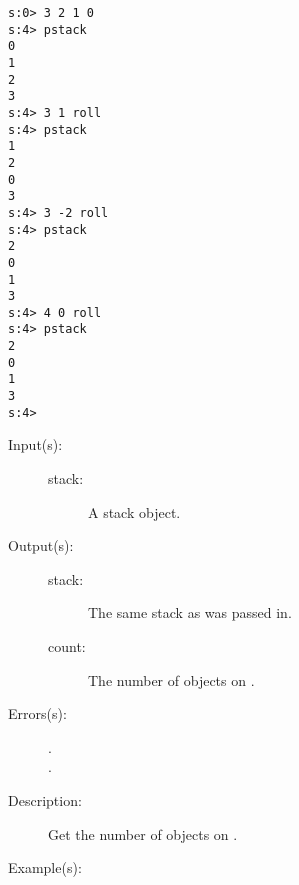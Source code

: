 \begin{description}
\begin{description}
\begin{verbatim}
s:0> 3 2 1 0 
s:4> pstack
0
1
2
3
s:4> 3 1 roll
s:4> pstack
1
2
0
3
s:4> 3 -2 roll
s:4> pstack
2
0
1
3
s:4> 4 0 roll
s:4> pstack
2
0
1
3
s:4>
		\end{verbatim}
	\end{description}
\label{systemdict:scount}
\item[{\stilop{stack}{scount}{stack count}}: ]
	\begin{description}\item[]
	\item[Input(s): ]
		\begin{description}\item[]
		\item[stack: ]
			A stack object.
		\end{description}
	\item[Output(s): ]
		\begin{description}\item[]
		\item[stack: ]
			The same stack as was passed in.
		\item[count: ]
			The number of objects on .
		\end{description}
	\item[Errors(s): ]
		\begin{description}\item[]
		\item[.]
		\item[.]
		\end{description}
	\item[Description: ]
		Get the number of objects on .
	\item[Example(s): ]\begin{verbatim}


\end{verbatim}
\end{description}
\end{description}
